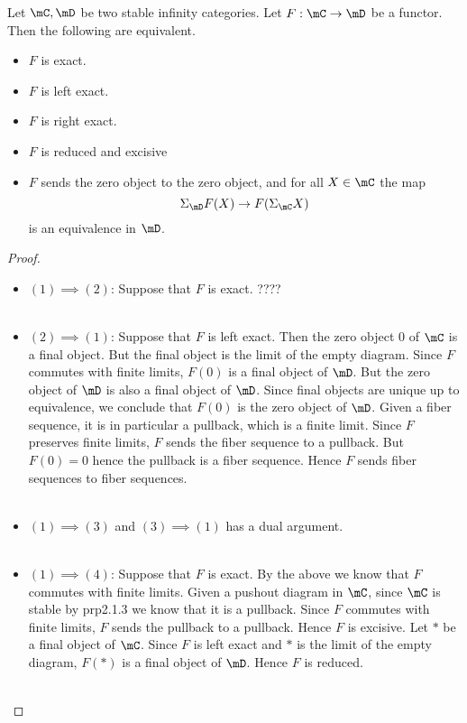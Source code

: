 \documentclass[a4paper]{article}
\begin{document}
\begin{prp}{}{} Let $\mC,\mD$ be two stable infinity categories. Let $F:\mC\to\mD$ be a functor. Then the following are equivalent. 
\begin{itemize}
\item $F$ is exact. 
\item $F$ is left exact. 
\item $F$ is right exact. 
\item $F$ is reduced and excisive
\item $F$ sends the zero object to the zero object, and for all $X\in\mC$ the map $$\Sigma_\mD F(X)\to F(\Sigma_\mC X)$$ is an equivalence in $\mD$. 
\end{itemize}\tcbline
\begin{proof}~\\
\begin{itemize}
\item $(1)\implies (2)$: Suppose that $F$ is exact. ????\\~\\

\item $(2)\implies (1)$: Suppose that $F$ is left exact. Then the zero object $0$ of $\mC$ is a final object. But the final object is the limit of the empty diagram. Since $F$ commutes with finite limits, $F(0)$ is a final object of $\mD$. But the zero object of $\mD$ is also a final object of $\mD$. Since final objects are unique up to equivalence, we conclude that $F(0)$ is the zero object of $\mD$. Given a fiber sequence, it is in particular a pullback, which is a finite limit. Since $F$ preserves finite limits, $F$ sends the fiber sequence to a pullback. But $F(0)=0$ hence the pullback is a fiber sequence. Hence $F$ sends fiber sequences to fiber sequences. \\~\\

\item $(1)\implies (3)$ and $(3)\implies (1)$ has a dual argument. \\~\\

\item $(1)\implies (4)$: Suppose that $F$ is exact. By the above we know that $F$ commutes with finite limits. Given a pushout diagram in $\mC$, since $\mC$ is stable by prp2.1.3 we know that it is a pullback. Since $F$ commutes with finite limits, $F$ sends the pullback to a pullback. Hence $F$ is excisive. Let $\ast$ be a final object of $\mC$. Since $F$ is left exact and $\ast$ is the limit of the empty diagram, $F(\ast)$ is a final object of $\mD$. Hence $F$ is reduced. \\~\\


\end{itemize}
\end{proof}
\end{prp}
\end{document}
